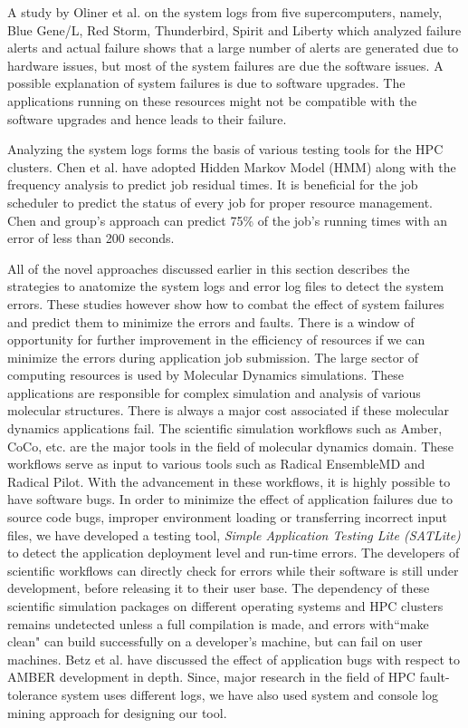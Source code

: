 \documentclass[10pt]{ruthesis}
\begin{document}
A study by Oliner et al. \cite{ref14} on the system logs from five supercomputers, namely, Blue Gene/L, Red Storm, Thunderbird, Spirit and Liberty which analyzed failure alerts and actual failure shows that a large number of alerts are generated due to hardware issues, but most of the system failures are due the software issues. A possible explanation of system failures is due to software upgrades. The applications running on these resources might not be compatible with the software upgrades and hence leads to their failure. 

Analyzing the system logs forms the basis of various testing tools for the HPC clusters. Chen et al. \cite{ref10} have adopted Hidden Markov Model (HMM) \cite{ref11} along with the frequency analysis to predict job residual times. It is beneficial for the job scheduler to predict the status of every job for proper resource management. Chen and group's approach can predict 75\% of the job's running times with an error of less than 200 seconds.  

All of the novel approaches discussed earlier in this section describes the strategies to anatomize the system logs and error log files to detect the system errors. These studies however show how to combat the effect of system failures and predict them to minimize the errors and faults. There is a window of opportunity for further improvement in the efficiency of resources if we can minimize the errors during application job submission. The large sector of computing resources is used by Molecular Dynamics simulations. These applications are responsible for complex simulation and analysis of various molecular structures. There is always a major cost associated if these molecular dynamics applications fail. The scientific simulation workflows such as Amber, CoCo, etc. are the major tools in the field of molecular dynamics domain. These workflows serve as input to various tools such as Radical EnsembleMD and Radical Pilot. With the advancement in these workflows, it is highly possible to have software bugs. In order to minimize the effect of application failures due to source code bugs, improper environment loading or transferring incorrect input files, we have developed a testing tool, \textit{Simple Application Testing Lite (SATLite)} to detect the application deployment level and run-time errors. The developers of scientific workflows can directly check for errors while their software is still under development, before releasing it to their user base. The dependency of these scientific simulation packages on different operating systems and HPC clusters remains undetected unless a full compilation is made, and errors with``make clean" \cite{ref16} can build successfully on a developer's machine, but can fail on user machines. Betz et al. \cite{ref16} have discussed the effect of application bugs with respect to AMBER development in depth. Since, major research in the field of HPC fault-tolerance system uses different logs, we have also used system and console log mining approach for designing our tool. 
\end{document}
